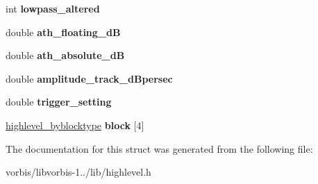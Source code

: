 \begin{DoxyCompactItemize}
\item 
\hypertarget{structhighlevel__encode__setup_af62698a474d022bcdb6c04814e84f2ae}{int {\bfseries lowpass\+\_\+altered}}\label{structhighlevel__encode__setup_af62698a474d022bcdb6c04814e84f2ae}

\item 
\hypertarget{structhighlevel__encode__setup_ab14fa6d156e75fe4d00f054776129077}{double {\bfseries ath\+\_\+floating\+\_\+d\+B}}\label{structhighlevel__encode__setup_ab14fa6d156e75fe4d00f054776129077}

\item 
\hypertarget{structhighlevel__encode__setup_aecc557dc95d32f87df532574ca5205d5}{double {\bfseries ath\+\_\+absolute\+\_\+d\+B}}\label{structhighlevel__encode__setup_aecc557dc95d32f87df532574ca5205d5}

\item 
\hypertarget{structhighlevel__encode__setup_a45038ea755b1204635bc8d93f2527877}{double {\bfseries amplitude\+\_\+track\+\_\+d\+Bpersec}}\label{structhighlevel__encode__setup_a45038ea755b1204635bc8d93f2527877}

\item 
\hypertarget{structhighlevel__encode__setup_adfa8e20fbbc4af279909d1a2aab5822f}{double {\bfseries trigger\+\_\+setting}}\label{structhighlevel__encode__setup_adfa8e20fbbc4af279909d1a2aab5822f}

\item 
\hypertarget{structhighlevel__encode__setup_ab4c8b364012b7b4fa38d94ec17c645cd}{\hyperlink{structhighlevel__byblocktype}{highlevel\+\_\+byblocktype} {\bfseries block} \mbox{[}4\mbox{]}}\label{structhighlevel__encode__setup_ab4c8b364012b7b4fa38d94ec17c645cd}

\end{DoxyCompactItemize}


The documentation for this struct was generated from the following file\+:\begin{DoxyCompactItemize}
\item 
vorbis/libvorbis-\/1../lib/highlevel.\+h\end{DoxyCompactItemize}
